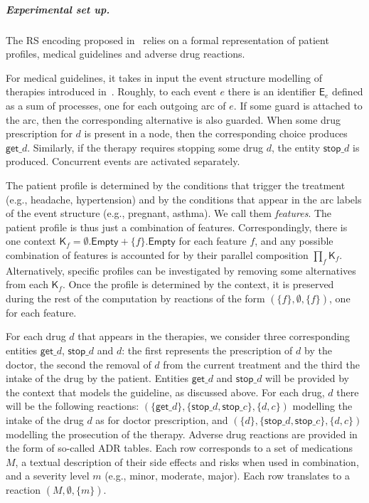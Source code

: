 \subparagraph*{Experimental set up.}
The RS encoding proposed in~\cite{DBLP:conf/cmsb/BowlesBBFGM24} relies on a formal representation of patient profiles, medical guidelines and adverse drug reactions.

For medical guidelines, it takes in input the event structure modelling of therapies introduced in~\cite{BC17c}. Roughly, to each event $e$ there is an identifier $\mathsf{E}_e$ defined as a sum of processes, one for each outgoing arc of $e$. If some guard is attached to the arc, then the corresponding alternative is also guarded. When some drug prescription for $d$ is present in a node, then the corresponding choice produces $\mathsf{get}\_d$. Similarly, if the therapy requires stopping some drug $d$, the entity $\mathsf{stop}\_d$ is produced.
Concurrent events are activated separately.

The patient profile is determined by the conditions that trigger the treatment (e.g., headache, hypertension) and by the conditions that appear in the arc labels of the event structure (e.g., pregnant, asthma). We call them \emph{features}. The patient profile is thus just a combination of features. Correspondingly, there is one context $\mathsf{K}_f = \emptyset.\mathsf{Empty} + \{f\}.\mathsf{Empty}$ for each feature $f$, and any possible combination of features is accounted for by their parallel composition $\prod_f \mathsf{K}_f$. Alternatively, specific profiles can be investigated by removing some alternatives from each $\mathsf{K}_f$.
Once the profile is determined by the context, it is preserved during the rest of the computation by reactions of the form $(\{f\},\emptyset,\{f\})$, one for each feature.

For each drug $d$ that appears in the therapies, we consider three corresponding entities $\mathsf{get}\_d$, $\mathsf{stop}\_d$  and $d$: the first represents the prescription of $d$ by the doctor, the second the removal of $d$ from the current treatment and the third the intake of the drug by the patient. 
Entities $\mathsf{get}\_d$ and $\mathsf{stop}\_d$ will be provided by the context that models the guideline, as discussed above. 
For each drug, $d$ there will be the following reactions: $(\{\mathsf{get}\_d\},\{\mathsf{stop}\_d,\mathsf{stop}\_c\},\{d,c\})$ modelling the intake of the drug $d$ as for doctor prescription, and $(\{d\},\{\mathsf{stop}\_d,\mathsf{stop}\_c\},\{d,c\})$ modelling the prosecution of the therapy.
Adverse drug reactions are provided in the form of so-called ADR tables.
Each row corresponds to a set of medications $M$, a textual description of their side effects and risks when used in combination, and a severity level $m$ (e.g., minor, moderate, major).
Each row translates to a reaction $(M,\emptyset,\{m\})$. 

